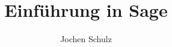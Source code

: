 {
  \usepackage{fullpage}
  \usepackage{pgf}
  \usepackage[xetex]{hyperref}
}

{
}
\usenavigationsymbolstemplate{}
\usepackage{multimedia}
\usepackage{fontspec,xunicode,xltxtra}


{
\leavevmode

\hfill\insertframenumber  \hspace{3pt}

  \vskip3pt%
}

\usepackage[ngerman]{babel}

%
%
\usepackage{amssymb}
\usepackage{amsthm}
\usepackage{amsmath}
\usepackage{amsxtra} %
\usepackage{empheq} %
\usepackage{bm}                 

\usepackage{mydef}
\title{Einführung in Sage}
%

\author{Jochen Schulz}

